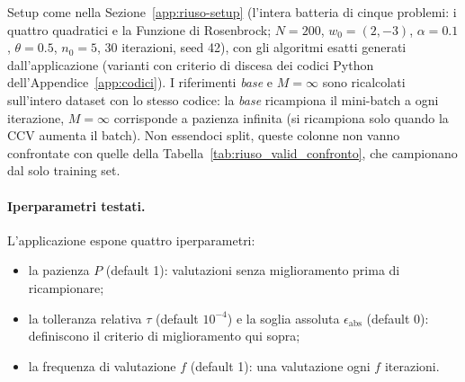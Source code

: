 \documentclass[a4paper,12pt]{article}
\numberwithin{equation}{section}
\numberwithin{figure}{section}
\numberwithin{table}{section}
\begin{document}
Setup come nella Sezione~\ref{app:riuso-setup} (l'intera batteria di cinque
problemi: i quattro quadratici e la Funzione di Rosenbrock;
$N=200$, $w_0=(2,-3)$, $\alpha=0.1$, $\theta=0.5$, $n_0=5$, 30 iterazioni,
seed 42), con gli algoritmi esatti generati dall'applicazione (varianti con
criterio di discesa dei codici Python dell'Appendice~\ref{app:codici}). I
riferimenti \emph{base} e $M=\infty$ sono ricalcolati sull'intero dataset
con lo stesso codice: la \emph{base} ricampiona il mini-batch a ogni
iterazione, $M=\infty$ corrisponde a pazienza infinita (si ricampiona solo
quando la CCV aumenta il batch). Non essendoci split, queste colonne non
vanno confrontate con quelle della
Tabella~\ref{tab:riuso_valid_confronto}, che campionano dal solo training
set.

\paragraph{Iperparametri testati.}
L'applicazione espone quattro iperparametri:
\begin{itemize}
  \item la pazienza $P$ (default 1): valutazioni senza miglioramento prima di
  ricampionare;
  \item la tolleranza relativa $\tau$ (default $10^{-4}$) e la soglia assoluta
  $\epsilon_{\mathrm{abs}}$ (default 0): definiscono il criterio di
  miglioramento qui sopra;
  \item la frequenza di valutazione $f$ (default 1): una valutazione ogni $f$
  iterazioni.
\end{itemize}

\end{document}
